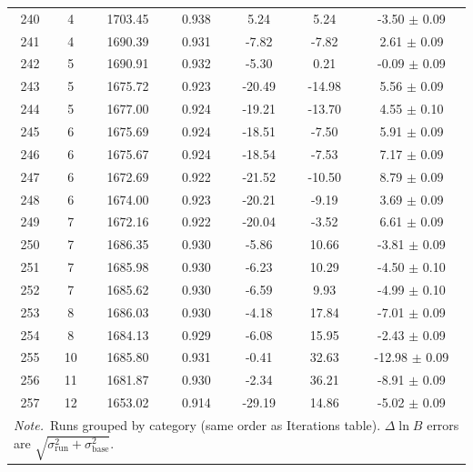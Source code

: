 \begin{longtable}{c c c c c c c}
    240 & 4 & 1703.45 & 0.938 & \cellcolor{aicorange}5.24 & \cellcolor{aicorange}5.24 & \cellcolor{aiclightred}-3.50 $\pm$ 0.09 \\
    241 & 4 & 1690.39 & 0.931 & \cellcolor{aiclightgreen}-7.82 & \cellcolor{aiclightgreen}-7.82 & \cellcolor{aicyellow}2.61 $\pm$ 0.09 \\
    242 & 5 & 1690.91 & 0.932 & \cellcolor{aicyellow}-5.30 & 0.21 & -0.09 $\pm$ 0.09 \\
    243 & 5 & 1675.72 & 0.923 & \cellcolor{aicgreen}-20.49 & \cellcolor{aicgreen}-14.98 & \cellcolor{aicgreen}5.56 $\pm$ 0.09 \\
    244 & 5 & 1677.00 & 0.924 & \cellcolor{aicgreen}-19.21 & \cellcolor{aicgreen}-13.70 & \cellcolor{aiclightgreen}4.55 $\pm$ 0.10 \\
    245 & 6 & 1675.69 & 0.924 & \cellcolor{aicgreen}-18.51 & \cellcolor{aiclightgreen}-7.50 & \cellcolor{aicgreen}5.91 $\pm$ 0.09 \\
    246 & 6 & 1675.67 & 0.924 & \cellcolor{aicgreen}-18.54 & \cellcolor{aiclightgreen}-7.53 & \cellcolor{aicgreen}7.17 $\pm$ 0.09 \\
    247 & 6 & 1672.69 & 0.922 & \cellcolor{aicgreen}-21.52 & \cellcolor{aicgreen}-10.50 & \cellcolor{aicgreen}8.79 $\pm$ 0.09 \\
    248 & 6 & 1674.00 & 0.923 & \cellcolor{aicgreen}-20.21 & \cellcolor{aiclightgreen}-9.19 & \cellcolor{aiclightgreen}3.69 $\pm$ 0.09 \\
    249 & 7 & 1672.16 & 0.922 & \cellcolor{aicgreen}-20.04 & \cellcolor{aiclightyellow}-3.52 & \cellcolor{aicgreen}6.61 $\pm$ 0.09 \\
    250 & 7 & 1686.35 & 0.930 & \cellcolor{aicyellow}-5.86 & \cellcolor{aicred}10.66 & \cellcolor{aiclightred}-3.81 $\pm$ 0.09 \\
    251 & 7 & 1685.98 & 0.930 & \cellcolor{aicyellow}-6.23 & \cellcolor{aicred}10.29 & \cellcolor{aiclightred}-4.50 $\pm$ 0.10 \\
    252 & 7 & 1685.62 & 0.930 & \cellcolor{aicyellow}-6.59 & \cellcolor{aiclightred}9.93 & \cellcolor{aiclightred}-4.99 $\pm$ 0.10 \\
    253 & 8 & 1686.03 & 0.930 & \cellcolor{aicyellow}-4.18 & \cellcolor{aicred}17.84 & \cellcolor{aicred}-7.01 $\pm$ 0.09 \\
    254 & 8 & 1684.13 & 0.929 & \cellcolor{aicyellow}-6.08 & \cellcolor{aicred}15.95 & \cellcolor{aicorange}-2.43 $\pm$ 0.09 \\
    255 & 10 & 1685.80 & 0.931 & -0.41 & \cellcolor{aicred}32.63 & \cellcolor{aicred}-12.98 $\pm$ 0.09 \\
    256 & 11 & 1681.87 & 0.930 & \cellcolor{aiclightyellow}-2.34 & \cellcolor{aicred}36.21 & \cellcolor{aicred}-8.91 $\pm$ 0.09 \\
    257 & 12 & 1653.02 & 0.914 & \cellcolor{aicgreen}-29.19 & \cellcolor{aicred}14.86 & \cellcolor{aicred}-5.02 $\pm$ 0.09 \\
    \multicolumn{7}{l}{\textit{Note.}~Runs grouped by category (same order as Iterations table).  $\Delta\ln B$ errors are $\sqrt{\sigma_\mathrm{run}^2 + \sigma_\mathrm{base}^2}$.}
\end{longtable}
\twocolumngrid
